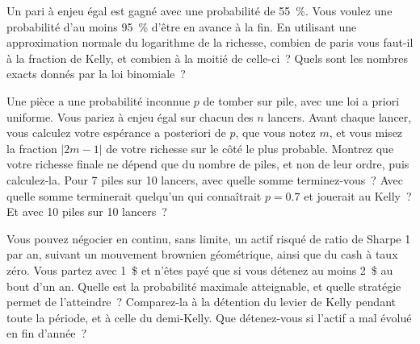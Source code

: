 \begin{question}\label{iq:iv2:betting-and-kelly:33}
Un pari à enjeu égal est gagné avec une probabilité de 55~\%. Vous voulez une probabilité d'au moins 95~\% d'être en avance à la fin. En utilisant une approximation normale du logarithme de la richesse, combien de paris vous faut-il à la fraction de Kelly, et combien à la moitié de celle-ci~? Quels sont les nombres exacts donnés par la loi binomiale~?
\end{question}

\begin{question}\label{iq:iv2:betting-and-kelly:34}
Une pièce a une probabilité inconnue $p$ de tomber sur pile, avec une loi a priori uniforme. Vous pariez à enjeu égal sur chacun des $n$ lancers. Avant chaque lancer, vous calculez votre espérance a posteriori de $p$, que vous notez $m$, et vous misez la fraction $|2m - 1|$ de votre richesse sur le côté le plus probable. Montrez que votre richesse finale ne dépend que du nombre de piles, et non de leur ordre, puis calculez-la. Pour 7 piles sur 10 lancers, avec quelle somme terminez-vous~? Avec quelle somme terminerait quelqu'un qui connaîtrait $p = 0.7$ et jouerait au Kelly~? Et avec 10 piles sur 10 lancers~?
\end{question}

\begin{question}\label{iq:iv2:betting-and-kelly:35}
Vous pouvez négocier en continu, sans limite, un actif risqué de ratio de Sharpe 1 par an, suivant un mouvement brownien géométrique, ainsi que du cash à taux zéro. Vous partez avec 1~\$ et n'êtes payé que si vous détenez au moins 2~\$ au bout d'un an. Quelle est la probabilité maximale atteignable, et quelle stratégie permet de l'atteindre~? Comparez-la à la détention du levier de Kelly pendant toute la période, et à celle du demi-Kelly. Que détenez-vous si l'actif a mal évolué en fin d'année~?
\end{question}
